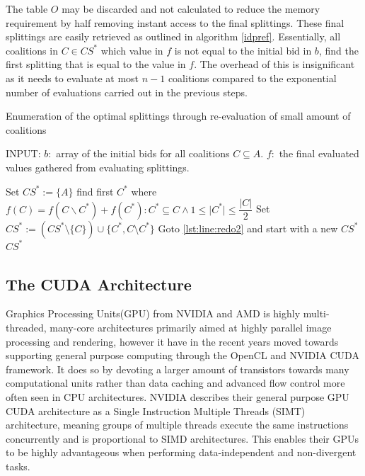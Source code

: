 \documentclass{aamas2012}
\begin{document}
The table $O$ may be discarded and not calculated to reduce the memory requirement by half removing instant access to the final splittings.
These final splittings are easily retrieved as outlined in algorithm \ref{idpref}. 
Essentially, all coalitions in $C \in CS^*$ which value in $f$
is not equal to the initial bid in $b$, find the first splitting that is equal to the value in $f$.
The overhead of this is insignificant as it needs to evaluate at most $n -1$ coalitions compared to the exponential
number of evaluations carried out in the previous steps\cite{eps265062}.

\begin{algorithm}
\caption{Enumeration of the optimal splittings through re-evaluation of small amount of coalitions \label{idpref}}
INPUT: $b:$ array of the initial bids for all coalitions $C \subseteq A$. 
$f:$ the final evaluated values gathered from evaluating splittings.
\begin{algorithmic}[1]
\STATE Set $CS^* := \{A\}$
 \label{lst:line:redo2}
\STATE find first $C^*$ where $f(C) = f(C\backslash C^*)+f(C^*):C^*\subseteq C \wedge 1 \leq \vert C^* \vert \leq \dfrac{\vert C \vert}{2}$ \label{lst:line:aa}
\STATE Set $CS^* := (CS^*\setminus \{C\})\cup \{C^*,C\setminus C^*\}$
\STATE Goto \ref{lst:line:redo2} and start with a new $CS^*$
\ENDIF
\ENDFOR
\RETURN $CS^*$
\end{algorithmic}
\end{algorithm}



\subsection{The CUDA Architecture} %
Graphics Processing Units(GPU) from NVIDIA and AMD is highly multi-threaded, many-core architectures primarily aimed at 
highly parallel image processing and rendering, however it have in the recent years moved towards supporting general purpose computing through 
the OpenCL and NVIDIA CUDA framework.
It does so by devoting a larger amount of transistors towards many computational units rather than data caching and advanced 
flow control more often seen in CPU architectures.
NVIDIA describes their general purpose GPU CUDA architecture as a Single Instruction Multiple Threads (SIMT) architecture, 
meaning groups of multiple threads execute the same instructions concurrently and is proportional to SIMD architectures. 
This enables their GPUs to be highly advantageous when performing data-independent and non-divergent tasks.
\end{document}
